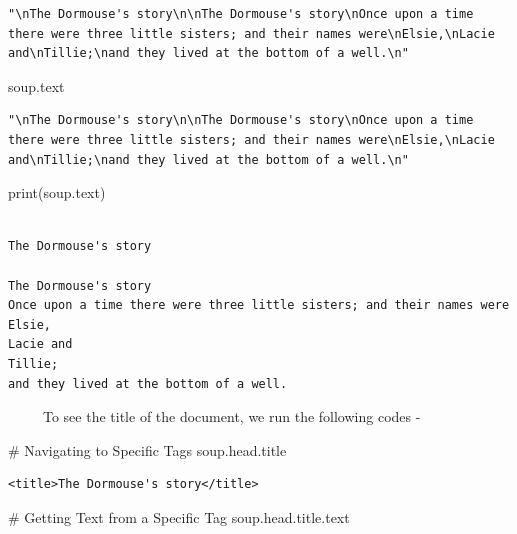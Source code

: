 \documentclass[
  letterpaper,
  DIV=11,
  numbers=noendperiod]{scrreprt}
\newenvironment{Shaded}{\begin{snugshade}}{\end{snugshade}}
\newcommand{\BuiltInTok}[1]{\textcolor[rgb]{0.00,0.23,0.31}{#1}}
\newcommand{\CommentTok}[1]{\textcolor[rgb]{0.37,0.37,0.37}{#1}}
\newcommand{\NormalTok}[1]{\textcolor[rgb]{0.00,0.23,0.31}{#1}}
\begin{document}
\begin{verbatim}
"\nThe Dormouse's story\n\nThe Dormouse's story\nOnce upon a time there were three little sisters; and their names were\nElsie,\nLacie and\nTillie;\nand they lived at the bottom of a well.\n"
\end{verbatim}

\begin{Shaded}
\begin{Highlighting}[]
\NormalTok{soup.text}
\end{Highlighting}
\end{Shaded}

\begin{verbatim}
"\nThe Dormouse's story\n\nThe Dormouse's story\nOnce upon a time there were three little sisters; and their names were\nElsie,\nLacie and\nTillie;\nand they lived at the bottom of a well.\n"
\end{verbatim}

\begin{Shaded}
\begin{Highlighting}[]
\BuiltInTok{print}\NormalTok{(soup.text)}
\end{Highlighting}
\end{Shaded}

\begin{verbatim}

The Dormouse's story

The Dormouse's story
Once upon a time there were three little sisters; and their names were
Elsie,
Lacie and
Tillie;
and they lived at the bottom of a well.
\end{verbatim}

~~~~~To see the title of the document, we run the following codes -

\begin{Shaded}
\begin{Highlighting}[]
\CommentTok{\# Navigating to Specific Tags }
\NormalTok{soup.head.title}
\end{Highlighting}
\end{Shaded}

\begin{verbatim}
<title>The Dormouse's story</title>
\end{verbatim}

\begin{Shaded}
\begin{Highlighting}[]
\CommentTok{\# Getting Text from a Specific Tag}
\NormalTok{soup.head.title.text}
\end{Highlighting}
\end{Shaded}
\end{document}
